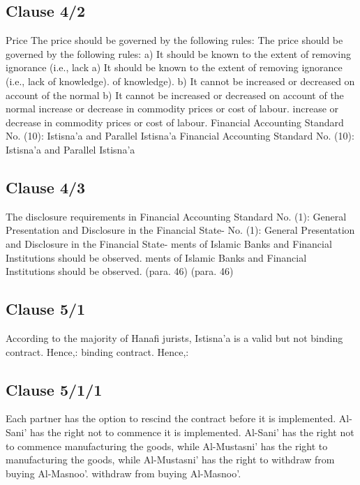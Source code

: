 \documentclass{article}%
\begin{document}
%
\subsection{Clause 4/2}%
\label{subsec:Clause4/2}%
Price   The price should be governed by the following rules:   The price should be governed by the following rules: a) It should be known to the extent of removing ignorance (i.e., lack  a) It should be known to the extent of removing ignorance (i.e., lack  of knowledge). of knowledge). b) It cannot be increased or decreased on account of the normal  b) It cannot be increased or decreased on account of the normal  increase or decrease in commodity prices or cost of labour. increase or decrease in commodity prices or cost of labour. Financial Accounting Standard No. (10): Istisna’a and Parallel Istisna’a Financial Accounting Standard No. (10): Istisna’a and Parallel Istisna’a

%
\subsection{Clause 4/3}%
\label{subsec:Clause4/3}%
The disclosure requirements in Financial Accounting Standard  No. (1): General Presentation and Disclosure in the Financial State- No. (1): General Presentation and Disclosure in the Financial State- ments of Islamic Banks and Financial Institutions should be observed.  ments of Islamic Banks and Financial Institutions should be observed.  (para. 46) (para. 46)

%
\subsection{Clause 5/1}%
\label{subsec:Clause5/1}%
According to the majority of Hanafi jurists, Istisna’a is a valid but not  binding contract. Hence,: binding contract. Hence,:

%
\subsection{Clause 5/1/1}%
\label{subsec:Clause5/1/1}%
Each partner has the option to rescind the contract before  it is implemented. Al-Sani’ has the right not to commence  it is implemented. Al-Sani’ has the right not to commence  manufacturing the goods, while Al-Mustasni’ has the right to  manufacturing the goods, while Al-Mustasni’ has the right to  withdraw from buying Al-Masnoo’. withdraw from buying Al-Masnoo’.

%
\end{document}
